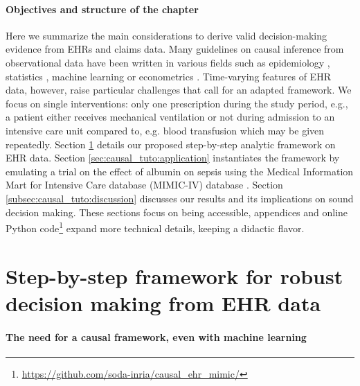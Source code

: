 \documentclass[french,12pt,twoside,a4paper]{book}
\begin{document}
\paragraph{Objectives and structure of the chapter} Here we summarize the main
considerations to derive valid decision-making evidence from EHRs and claims
data.
%
Many guidelines on causal inference from observational data have been
written in various
fields such as epidemiology \citep{hernan2020causal, schneeweiss2021conducting,
  zeng2022uncovering}, statistics \citep{belloni2014high,
  chernozhukov2018double}, machine learning \citep{shalit2016tutorial,
  sharma2018tutorial,moraffah2021causal} or econometrics \citep{imbens2009recent}.
Time-varying features of EHR data, however, raise particular challenges that call
for an adapted framework.
%
We focus on single interventions: only one prescription during the study period,
e.g., a patient either receives mechanical ventilation or not during admission to an
intensive care unit compared to, e.g. blood transfusion which may be given repeatedly.
%
Section \ref{sec:causal_tuto:framework} details our proposed step-by-step
analytic framework on EHR data. Section \ref{sec:causal_tuto:application}
instantiates the framework by emulating a trial on the effect of albumin on
sepsis using the Medical Information Mart for Intensive Care database (MIMIC-IV)
database \citep{johnson2020mimic}. Section \ref{subsec:causal_tuto:discussion}
discusses our results and its implications on sound decision making. These
sections focus on being accessible, appendices and online Python
code\footnote{\url{https://github.com/soda-inria/causal_ehr_mimic/}} expand more
technical details, keeping a didactic flavor.



\section{Step-by-step framework for robust decision making from EHR data}%
\label{sec:causal_tuto:framework}%


\paragraph{The need for a causal framework, even with machine learning}\label{causal_tuto:motivating_example}
\end{document}
